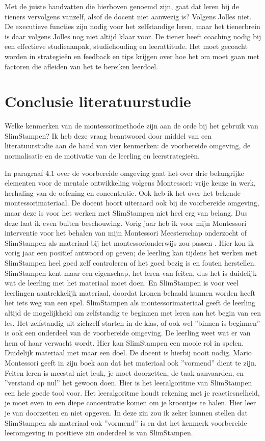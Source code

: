 \documentclass[12pt, a4paper]{article}
\begin{document}
Met de juiste handvatten die hierboven genoemd zijn, gaat dat leren bij de tieners vervolgens vanzelf, alsof de docent niet aanwezig is? Volgens Jolles niet. De executieve functies zijn nodig voor het zelfstandige leren, maar het tienerbrein is daar volgens Jolles nog niet altijd klaar voor. De tiener heeft coaching nodig bij een effectieve studieaanpak, studiehouding en leerattitude. Het moet gecoacht worden in strategieën en feedback en tips krijgen over hoe het om moet gaan met factoren die afleiden van het te bereiken leerdoel.\cite[p.152]{jolles}
\newpage
\section{Conclusie literatuurstudie}
Welke kenmerken van de montessorimethode zijn aan de orde bij het gebruik van SlimStampen? Ik heb deze vraag beantwoord door middel van een literatuurstudie aan de hand van vier kenmerken: de voorbereide omgeving, de normalisatie en de motivatie van de leerling en leerstrategieën.

In paragraaf 4.1 over de voorbereide omgeving gaat het over drie belangrijke elementen voor de mentale ontwikkeling volgens Montessori: vrije keuze in werk, herhaling van de oefening en concentratie. Ook heb ik het over het bekende montessorimateriaal. De docent hoort uiteraard ook bij de voorbereide omgeving, maar deze is voor het werken met SlimStampen niet heel erg van belang. Dus deze laat ik even buiten beschouwing. Vorig jaar heb ik voor mijn Montessori interventie voor het behalen van mijn Montessori Meesterschap onderzocht of SlimStampen als materiaal bij het montessorionderwijs zou passen \cite[]{Marijn23}. Hier kon ik vorig jaar een positief antwoord op geven; de leerling kan tijdens het werken met SlimStampen heel goed zelf controleren of het goed bezig is en fouten herstellen. SlimStampen kent maar een eigenschap, het leren van feiten, dus het is duidelijk wat de leerling met het materiaal moet doen. En SlimStampen is voor veel leerlingen aantrekkelijk materiaal, doordat kronen behaald kunnen worden heeft het iets weg van een spel. SlimStampen als montessorimateriaal geeft de leerling altijd de mogelijkheid om zelfstandig te beginnen met leren aan het begin van een les. Het zelfstandig uit zichzelf starten in de klas, of ook wel ''binnen is beginnen'' is ook een onderdeel van de voorbereide omgeving. De leerling weet wat er van hem of haar verwacht wordt. Hier kan SlimStampen een mooie rol in spelen. Duidelijk materiaal met maar een doel. De docent is hierbij nooit nodig.
Mario Montessori geeft in zijn boek \cite[]{Mario} aan dat het materiaal ook ''vormend'' dient te zijn. Feiten leren is meestal niet leuk, je moet doorzetten, de taak aanvaarden, en ''verstand op nul'' het gewoon doen. Hier is het leeralgoritme van SlimStampen een hele goede tool voor. Het leeralgoritme houdt rekening met je reactiesnelheid, je moet even in een diepe concentratie komen om je kroontjes te halen. Hier leer je van doorzetten en niet opgeven. In deze zin zou ik zeker kunnen stellen dat SlimStampen als materiaal ook ''vormend'' is en dat het kenmerk voorbereide leeromgeving in positieve zin onderdeel is van SlimStampen.
\end{document}
